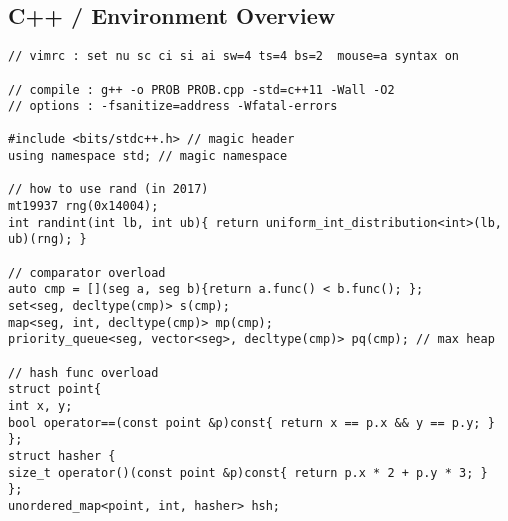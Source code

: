 \documentclass[landscape, 10pt, a4paper, oneside,  twocolumn]{article}
\begin{document}
\subsection {C++ / Environment Overview}
\begin{verbatim}	
// vimrc : set nu sc ci si ai sw=4 ts=4 bs=2  mouse=a syntax on

// compile : g++ -o PROB PROB.cpp -std=c++11 -Wall -O2
// options : -fsanitize=address -Wfatal-errors

#include <bits/stdc++.h> // magic header
using namespace std; // magic namespace

// how to use rand (in 2017)
mt19937 rng(0x14004);
int randint(int lb, int ub){ return uniform_int_distribution<int>(lb, ub)(rng); }

// comparator overload
auto cmp = [](seg a, seg b){return a.func() < b.func(); };
set<seg, decltype(cmp)> s(cmp); 
map<seg, int, decltype(cmp)> mp(cmp);
priority_queue<seg, vector<seg>, decltype(cmp)> pq(cmp); // max heap

// hash func overload
struct point{
int x, y;
bool operator==(const point &p)const{ return x == p.x && y == p.y; }
};
struct hasher {
size_t operator()(const point &p)const{ return p.x * 2 + p.y * 3; }
};
unordered_map<point, int, hasher> hsh;

\end{verbatim}
\end{document}
